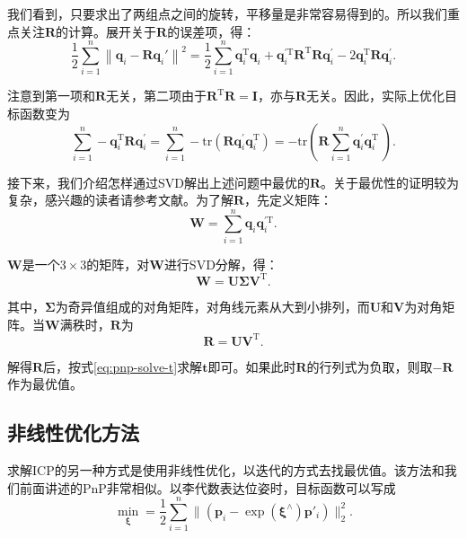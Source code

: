 我们看到，只要求出了两组点之间的旋转，平移量是非常容易得到的。所以我们重点关注$\bm{R}$的计算。展开关于$\bm{R}$的误差项，得：
\begin{equation}
 \frac{1}{2}\sum\limits_{i = 1}^n \left\| {{\bm{q}_i} - \bm{R} \bm{q}_i' } \right\|^2 = \frac{1}{2}\sum\limits_{i = 1}^n \bm{q}_i^\mathrm{T} \bm{q}_i + \bm{q}_i^{ \prime \mathrm{T}}  \bm{R}^\mathrm{T} \bm{R} \bm{q}^\prime_i - 2\bm{q}_i^\mathrm{T} \bm{R} \bm{q}^\prime_i.
\end{equation}

注意到第一项和$\bm{R}$无关，第二项由于$\bm{R}^\mathrm{T}\bm{R}=\bm{I}$，亦与$\bm{R}$无关。因此，实际上优化目标函数变为
\begin{equation}
\sum\limits_{i = 1}^n - \bm{q}_i^\mathrm{T} \bm{R} \bm{q}^\prime_i = \sum\limits_{i = 1}^n -\mathrm{tr} \left( \bm{R} \bm{q}_i^{\prime} \bm{q}^{\mathrm{T}}_i \right) = - \mathrm{tr} \left( \bm{R} \sum\limits_{i = 1}^n \bm{q}_i^{\prime} \bm{q}^{\mathrm{T}}_i \ \right).
\end{equation}

接下来，我们介绍怎样通过SVD解出上述问题中最优的$\bm{R}$。关于最优性的证明较为复杂，感兴趣的读者请参考文献\cite{Arun1987, PomerleauColasSiegwart2015}。为了解$\bm{R}$，先定义矩阵：
\begin{equation}
\bm{W} =  \sum\limits_{i = 1}^n \bm{q}_i \bm{q}^{\prime \mathrm{T}}_i.
\end{equation}

$\bm{W}$是一个$3 \times 3$的矩阵，对$\bm{W}$进行SVD分解，得：
\begin{equation}
\bm{W} = \bm{U \Sigma V}^\mathrm{T}.
\end{equation}

其中，$\bm{\Sigma}$为奇异值组成的对角矩阵，对角线元素从大到小排列，而$\bm{U}$和$\bm{V}$为对角矩阵。当$\bm{W}$满秩时，$\bm{R}$为
\begin{equation}
\bm{R} = \bm{U} \bm{V}^\mathrm{T}.
\end{equation}

解得$\bm{R}$后，按式\eqref{eq:pnp-solve-t}求解$\bm{t}$即可。如果此时$\bm{R}$的行列式为负取，则取$-\bm{R}$作为最优值。

\subsection{非线性优化方法}
求解ICP的另一种方式是使用非线性优化，以迭代的方式去找最优值。该方法和我们前面讲述的PnP非常相似。以李代数表达位姿时，目标函数可以写成
\begin{equation}
\mathop {\min }\limits_{\boldsymbol{\xi}} = \frac{1}{2} \sum\limits_{i = 1}^n\| {\left( {{{\bm{p}}_i} - \exp \left( \boldsymbol{\xi}^\wedge \right) {\bm{p}}'_i} \right)} \|^2_2.
\end{equation}

